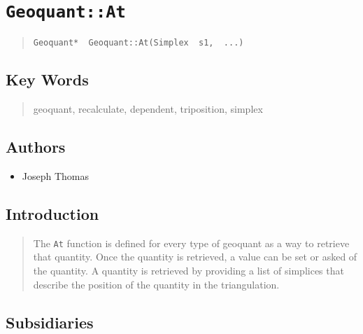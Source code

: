 \documentclass[10pt]{article}%
\begin{document}

\section*{\texttt{Geoquant::At}}

\label{f0}\begin{quotation} {\small{\begin{verbatim} 
Geoquant*  Geoquant::At(Simplex  s1,  ...)
  \end{verbatim}
}}
\end{quotation}
\subsection*{Key Words}

\begin{quotation} geoquant, recalculate, dependent, triposition, simplex\end{quotation}

\subsection*{Authors}

\begin{itemize}\item  Joseph Thomas
\end{itemize}
\begin{quotation} \end{quotation}
\subsection*{Introduction}

\begin{quotation} The \texttt{At} function is defined for every type of geoquant as a way to retrieve that quantity. Once the quantity is retrieved, a value can be set or asked of the quantity. A quantity is retrieved by providing a list of simplices that describe the position of the quantity in the triangulation.\end{quotation}

\subsection*{Subsidiaries}
\end{document}
